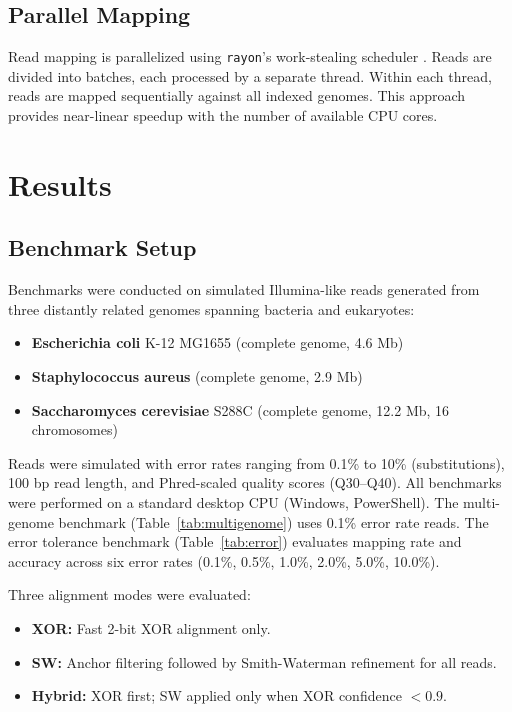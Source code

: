 \documentclass[utf8]{article}
\begin{document}
\subsection{Parallel Mapping}

Read mapping is parallelized using \texttt{rayon}'s work-stealing scheduler \citep{rayon}. Reads are divided into batches, each processed by a separate thread. Within each thread, reads are mapped sequentially against all indexed genomes. This approach provides near-linear speedup with the number of available CPU cores.

\section{Results}

\subsection{Benchmark Setup}

Benchmarks were conducted on simulated Illumina-like reads generated from three distantly related genomes spanning bacteria and eukaryotes:
\begin{itemize}
    \item \textbf{Escherichia coli} K-12 MG1655 (complete genome, 4.6 Mb)
    \item \textbf{Staphylococcus aureus} (complete genome, 2.9 Mb)
    \item \textbf{Saccharomyces cerevisiae} S288C (complete genome, 12.2 Mb, 16 chromosomes)
\end{itemize}

Reads were simulated with error rates ranging from 0.1\% to 10\% (substitutions), 100 bp read length, and Phred-scaled quality scores (Q30--Q40). All benchmarks were performed on a standard desktop CPU (Windows, PowerShell). The multi-genome benchmark (Table~\ref{tab:multigenome}) uses 0.1\% error rate reads. The error tolerance benchmark (Table~\ref{tab:error}) evaluates mapping rate and accuracy across six error rates (0.1\%, 0.5\%, 1.0\%, 2.0\%, 5.0\%, 10.0\%).

Three alignment modes were evaluated:
\begin{itemize}
    \item \textbf{XOR:} Fast 2-bit XOR alignment only.
    \item \textbf{SW:} Anchor filtering followed by Smith-Waterman refinement for all reads.
    \item \textbf{Hybrid:} XOR first; SW applied only when XOR confidence $< 0.9$.
\end{itemize}
\end{document}
